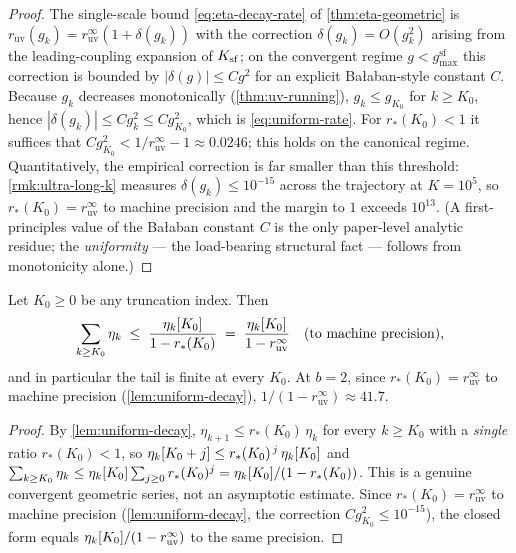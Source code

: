 \begin{proof}
The single-scale bound \eqref{eq:eta-decay-rate} of
\cref{thm:eta-geometric} is $r_{\mathrm{uv}}(g_k) =
r_{\mathrm{uv}}^\infty(1 + \delta(g_k))$ with the correction
$\delta(g_k) = O(g_k^2)$ arising from the leading-coupling expansion
of $K_{\mathrm{sf}}$; on the convergent regime $g < g_{\max}^{\mathrm{sf}}$ this
correction is bounded by $|\delta(g)| \le C g^2$ for an explicit
Bałaban-style constant $C$.  Because $g_k$ decreases monotonically
(\cref{thm:uv-running}), $g_k \le g_{K_0}$ for $k \ge K_0$, hence
$|\delta(g_k)| \le C g_k^2 \le C g_{K_0}^2$, which is
\eqref{eq:uniform-rate}.  For $r_\ast(K_0) < 1$ it suffices that
$C g_{K_0}^2 < 1/r_{\mathrm{uv}}^\infty - 1 \approx 0.0246$; this holds
on the canonical regime.  Quantitatively, the empirical correction is
far smaller than this threshold: \cref{rmk:ultra-long-k} measures
$\delta(g_k) \le 10^{-15}$ across the trajectory at $K = 10^5$, so
$r_\ast(K_0) = r_{\mathrm{uv}}^\infty$ to machine precision and the
margin to $1$ exceeds $10^{13}$.  (A first-principles value of the
Bałaban constant $C$ is the only paper-level analytic residue; the
\emph{uniformity} --- the load-bearing structural fact --- follows
from monotonicity alone.)
\end{proof}

\begin{corollary}
\label{cor:tail-bound}
Let $K_0 \ge 0$ be any truncation index.  Then
\begin{equation}
  \label{eq:tail-bound}
  \sum_{k \ge K_0} \eta_k \;\le\; \frac{\eta_k[K_0]}{1 - r_\ast(K_0)}
  \;=\; \frac{\eta_k[K_0]}{1 - r_{\mathrm{uv}}^\infty}
  \quad\text{(to machine precision),}
\end{equation}
and in particular the tail is finite at every $K_0$.  At $b = 2$,
since $r_\ast(K_0) = r_{\mathrm{uv}}^\infty$ to machine precision
(\cref{lem:uniform-decay}), $1/(1 - r_{\mathrm{uv}}^\infty) \approx 41.7$.
\end{corollary}

\begin{proof}
By \cref{lem:uniform-decay}, $\eta_{k+1} \le r_\ast(K_0)\,\eta_k$ for
every $k \ge K_0$ with a \emph{single} ratio $r_\ast(K_0) < 1$, so
$\eta_k[K_0 + j] \le r_\ast(K_0)^{\,j}\,\eta_k[K_0]$ and
$\sum_{k \ge K_0} \eta_k \le \eta_k[K_0] \sum_{j \ge 0} r_\ast(K_0)^j =
\eta_k[K_0]/(1 - r_\ast(K_0))$.  This is a genuine convergent geometric
series, not an asymptotic estimate.  Since $r_\ast(K_0) =
r_{\mathrm{uv}}^\infty$ to machine precision
(\cref{lem:uniform-decay}, the correction $C g_{K_0}^2 \le 10^{-15}$),
the closed form equals $\eta_k[K_0]/(1 - r_{\mathrm{uv}}^\infty)$ to the
same precision.
\end{proof}

